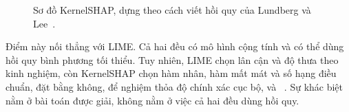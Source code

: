 \begin{figure}[htbp]
  \centering
  
  \caption{Sơ đồ KernelSHAP, dựng theo cách viết hồi quy của Lundberg và
  Lee~\autocite{p10shap}.}
  \label{fig:ch04-kernelshap}
\end{figure}

Điểm này nối thẳng với LIME. Cả hai đều có mô hình cộng tính và có thể dùng
hồi quy bình phương tối thiểu. Tuy nhiên, LIME chọn  lân
cận và độ thưa theo kinh nghiệm, còn KernelSHAP chọn hàm nhân, hàm mất mát và
số hạng điều chuẩn, đặt bằng không, để nghiệm thỏa độ chính xác cục bộ,
 và
~\autocite{p10shap}. Sự khác
biệt nằm ở bài toán được giải, không nằm ở việc cả hai đều dùng hồi quy.
